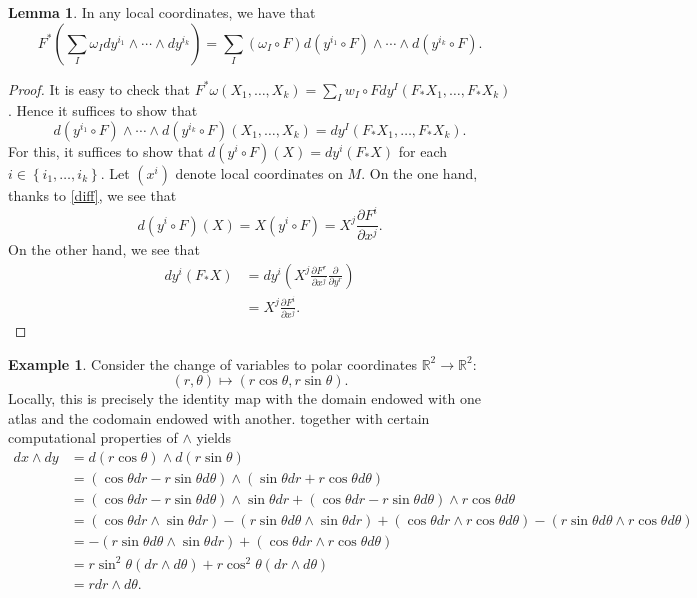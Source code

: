 \documentclass[10pt,letterpaper,cm]{nupset}
\theoremstyle{definition}
\newtheorem{exmp}[definition]{Example}
\theoremstyle{theorem}
\newtheorem{lemma}[definition]{Lemma}
\theoremstyle{remark}
\newcommand{\R}{\mathbb R}
\newcommand{\1}{\mathbf{1}}
\newcommand{\0}{\vec 0}
\begin{document}
\begin{lemma}\label{natpull}
In any local coordinates, we have that $$F^{\ast}\left(\sum_I \omega_I dy^{i_1} \wedge \cdots \wedge dy^{i_k}\right) = \sum_I \left(\omega_I \circ F\right)d\left(y^{i_1} \circ F\right) \wedge \cdots \wedge d\left(y^{i_k} \circ F\right).$$
\end{lemma}
\begin{proof}
It is easy to check that $F^{\ast}{\omega}\left(X_1, \ldots, X_k\right) = \sum_Iw_I\circ Fdy^I\left(F_{\ast}{X_1}, \ldots, F_{\ast}{X_k}\right)$. Hence it suffices to show that 
\[
d\left(y^{i_1} \circ F\right) \wedge \cdots \wedge d\left(y^{i_k} \circ F\right)\left(X_1, \ldots, X_k\right) = dy^I\left(F_{\ast}{X_1}, \ldots, F_{\ast}{X_k}\right).
\] For this, it suffices to show that $d\left(y^i \circ F\right)(X) = dy^i\left(F_{\ast}{X}\right)$ for each $i \in \left\{ i_1, \ldots, i_k\right\}$. Let $\left(x^i\right)$ denote local coordinates on $M$. On the one hand, thanks to \cref{diff}, we see that
\[
d\left(y^i \circ F\right)(X)  = X\left(y^i \circ F\right)
= X^j\frac{\partial{F^i}}{\partial{x^j}}
. \]
On the other hand, we see that
\begin{align*}
dy^i\left(F_{\ast}{X}\right) & = dy^i\left(X^j\frac{\partial{F^r}}{\partial{x^j}}\frac{\partial}{\partial{y^r}}    \right)
\\ & = X^j\frac{\partial{F^i}}{\partial{x^j}}
.\end{align*}
\end{proof}



\begin{exmp}
Consider the change of variables to polar coordinates $\R^2 \to \R^2$: $$\left(r, \theta\right) \mapsto \left(r\cos \theta, r\sin \theta\right).$$ Locally, this is precisely the identity map with the domain endowed with one atlas and the codomain endowed with another.  together with certain computational properties of $\wedge$ yields
\begin{align*}  dx \wedge dy & = d(r\cos \theta) \wedge d(r\sin \theta) \\ &=   \left(\cos \theta dr - r\sin \theta d\theta\right) \wedge \left(\sin \theta dr +r \cos \theta d\theta\right) \\ &= \left(\cos \theta dr - r\sin \theta d\theta\right) \wedge \sin \theta dr + \left(\cos \theta dr - r\sin \theta d\theta\right) \wedge r \cos \theta d\theta \\ & = \left(\cos \theta dr \wedge \sin \theta dr\right) - \left(r \sin \theta d \theta \wedge \sin \theta dr\right) +  \left(\cos \theta dr \wedge r \cos \theta d\theta\right) - \left(r\sin \theta d \theta \wedge r \cos \theta d \theta\right)\\ & =  {-\left(r \sin \theta d \theta \wedge \sin \theta dr\right)} +  \left(\cos \theta dr \wedge r \cos \theta d\theta\right) \\ & = r\sin^2\theta(dr \wedge d\theta) + r\cos^2 \theta(dr \wedge d\theta)\\ & = rdr \wedge d\theta.
\end{align*}
\end{exmp}
\end{document}

